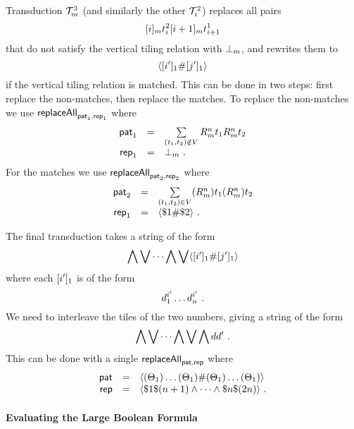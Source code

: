 Transduction $\psst^3_\expheight$ (and similarly the other $\psst^2_\idxi$)
replaces all pairs
\[
    \tenc{\expheight}{\idxi} \tile^2_\idxi
    \tenc{\expheight}{\idxi + 1} \tile^1_{\idxi+1}
\]
that do not satisfy the vertical tiling relation with $\sffalse{\expheight}$,
and rewrites them to
\[
    \lmark
        \tenc{1}{\idxi'} \spacer \tenc{1}{\idxj'}
    \rmark
\]
if the vertical tiling relation is matched. This can be done in two steps:
first replace the non-matches, then replace the matches. To replace the
non-matches we use $\replaceall_{\pat_1, \rep_1}$ where
\[
    \begin{array}{rcl}
        \pat_1 &=& \sum\limits_{\tup{\tile_1, \tile_2} \notin \vrel}
            \isnum{\expheight}{\linlen} \tile_1
            \isnum{\expheight}{\linlen} \tile_2 \\
        \rep_1 &=& \sffalse{\expheight} \ .
    \end{array}
\]
For the matches we use $\replaceall_{\pat_2, \rep_2}$ where
\[
    \begin{array}{rcl}
        \pat_2 &=& \sum\limits_{\tup{\tile_1, \tile_2} \in \vrel}
            (\isnum{\expheight}{\linlen}) \tile_1
            (\isnum{\expheight}{\linlen}) \tile_2 \\
        \rep_1 &=& \langle \$1 \spacer \$2 \rangle \ .
    \end{array}
\]

The final transduction takes a string of the form
\[
    \bigwedge \bigvee \cdots \bigwedge \bigvee \lmark
        \tenc{1}{\idxi'} \spacer \tenc{1}{\idxj'}
    \rmark
\]
where each $\tenc{1}{\idxi'}$ is of the form
\[
    \vartile^{\idxi'}_1 \ldots \vartile^{\idxi'}_\linlen \ .
\]
We need to interleave the tiles of the two numbers, giving a string of the form
\[
    \bigwedge \bigvee \cdots \bigwedge \bigvee \bigwedge \vartile \vartile' \ .
\]
This can be done with a single $\replaceall_{\pat, \rep}$ where
\[
    \begin{array}{rcl}
        \pat &=&
            \langle
                (\tilesnum{1}) \ldots (\tilesnum{1})
            \spacer
                (\tilesnum{1}) \ldots (\tilesnum{1})
            \rangle \\
        \rep &=&
            \langle
                \$1 \$(\linlen + 1)
                \land \cdots \land
                \$\linlen \$(2\linlen)
            \rangle \ . \\
    \end{array}
\]

\paragraph{Evaluating the Large Boolean Formula}

